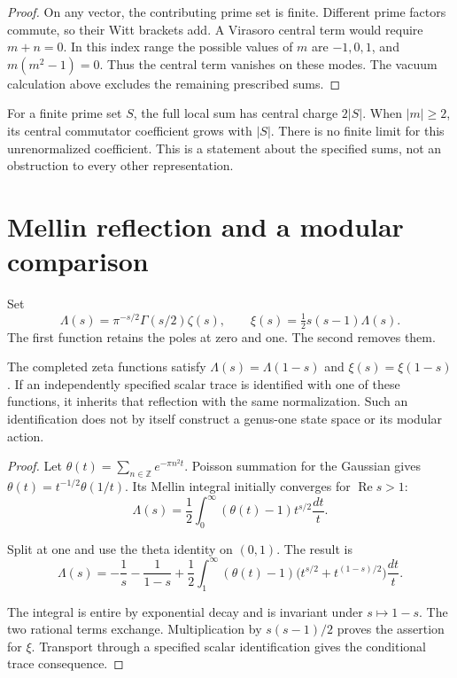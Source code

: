 \begin{proof}
On any vector, the contributing prime set is finite.
Different prime factors commute, so their Witt brackets add.
A Virasoro central term would require \(m+n=0\).
In this index range the possible values of \(m\) are
\(-1,0,1\), and \(m(m^2-1)=0\).
Thus the central term vanishes on these modes.
The vacuum calculation above excludes the remaining prescribed sums.
\end{proof}

\begin{remark}
For a finite prime set \(S\), the full local sum has central
charge \(2|S|\). When \(|m|\geq2\), its central commutator
coefficient grows with \(|S|\). There is no finite limit for
this unrenormalized coefficient. This is a statement about the
specified sums, not an obstruction to every other representation.
\end{remark}

\section{Mellin reflection and a modular comparison}
\label{v4-arith:pol:functional-equation-modular}

Set
\[
 \Lambda(s)=\pi^{-s/2}\Gamma(s/2)\zeta(s),\qquad
 \xi(s)=\tfrac12s(s-1)\Lambda(s).
\]
The first function retains the poles at zero and one.
The second removes them.

\begin{theorem}\label{v4-arith:thm:arithmetic-modular-invariance}
The completed zeta functions satisfy
\(\Lambda(s)=\Lambda(1-s)\) and \(\xi(s)=\xi(1-s)\).
If an independently specified scalar trace is identified with
one of these functions, it inherits that reflection with the
same normalization. Such an identification does not by itself
construct a genus-one state space or its modular action.
\end{theorem}

\begin{proof}
Let \(\theta(t)=\sum_{n\in\mathbb Z}e^{-\pi n^2t}\).
Poisson summation for the Gaussian gives
\(\theta(t)=t^{-1/2}\theta(1/t)\).
Its Mellin integral initially converges for \(\operatorname{Re}s>1\):
\[
 \Lambda(s)=\frac12\int_0^\infty(\theta(t)-1)t^{s/2}\frac{dt}{t}.
\]

Split at one and use the theta identity on \((0,1)\).
The result is
\[
 \Lambda(s)=-\frac1s-\frac1{1-s}
       +\frac12\int_1^\infty(\theta(t)-1)
                   \bigl(t^{s/2}+t^{(1-s)/2}\bigr)\frac{dt}{t}.
\]

The integral is entire by exponential decay and is invariant
under \(s\mapsto1-s\). The two rational terms exchange.
Multiplication by \(s(s-1)/2\) proves the assertion for \(\xi\).
Transport through a specified scalar identification gives the
conditional trace consequence.
\end{proof}

